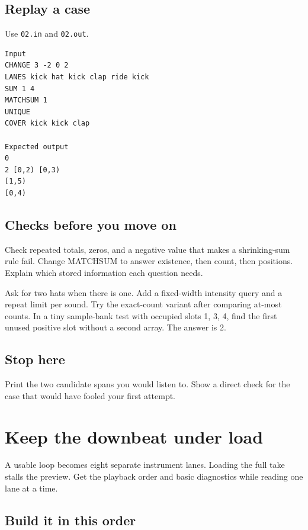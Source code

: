 \documentclass[11pt,letterpaper]{article}
\begin{document}
\subsection*{Replay a case}

Use \texttt{02.in} and \texttt{02.out}.

\begin{samepage}
\small
\begin{verbatim}
Input
CHANGE 3 -2 0 2
LANES kick hat kick clap ride kick
SUM 1 4
MATCHSUM 1
UNIQUE
COVER kick kick clap

Expected output
0
2 [0,2) [0,3)
[1,5)
[0,4)
\end{verbatim}
\end{samepage}

\subsection*{Checks before you move on}

Check repeated totals, zeros, and a negative value that makes a shrinking-sum rule fail. Change MATCHSUM to answer existence, then count, then positions. Explain which stored information each question needs.

Ask for two hats when there is one. Add a fixed-width intensity query and a repeat limit per sound. Try the exact-count variant after comparing at-most counts. In a tiny sample-bank test with occupied slots 1, 3, 4, find the first unused positive slot without a second array. The answer is 2.

\subsection*{Stop here}

Print the two candidate spans you would listen to. Show a direct check for the case that would have fooled your first attempt.

\clearpage

\section{Keep the downbeat under load}\label{groovebox:03}

A usable loop becomes eight separate instrument lanes. Loading the full take stalls the preview. Get the playback order and basic diagnostics while reading one lane at a time.

\subsection*{Build it in this order}
\end{document}
